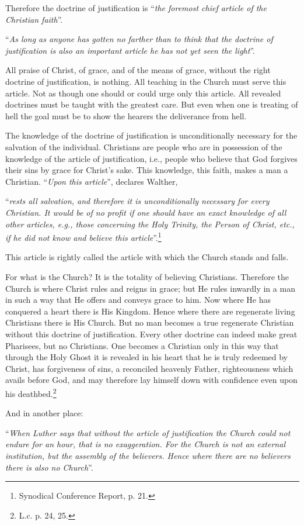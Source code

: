                 Therefore the doctrine of justification is “\textit{the foremost chief article of the Christian faith}”.  \begin{displayquote} “\textit{As long as anyone has gotten no farther than to think that the doctrine of justification is also an important article he has not yet seen the light}”.\end{displayquote} All praise of Christ, of grace, and of the means of grace, without the right doctrine of justification, is nothing.  All teaching in the Church must serve this article.  Not as though one should or could urge only this article.  All revealed doctrines must be taught with the greatest care.  But even when one is treating of hell the goal must be to show the hearers the deliverance from hell.

                The knowledge of the doctrine of justification is unconditionally necessary for the salvation of the individual.  Christians are people who are in possession of the knowledge of the article of justification, i.e., people who believe that God forgives their sins by grace for Christ’s sake.  This knowledge, this faith, makes a man a Christian.  “\textit{Upon this article}”, declares Walther, \begin{displayquote}``\textit{rests all salvation, and therefore it is unconditionally necessary for every Christian.  It would be of no profit if one should have an exact knowledge of all other articles, e.g., those concerning the Holy Trinity, the Person of Christ, etc., if he did not know and believe this article}”.\footnote{Synodical Conference Report, p. 21.}\end{displayquote}

                This article is rightly called the article with which the Church stands and falls.  \begin{fancyquotes}For what is the Church?  \divider It is the totality of believing Christians.  Therefore the Church is where Christ rules and reigns in grace; but He rules inwardly in a man in such a way that He offers and conveys grace to him.  Now where He has conquered a heart there is His Kingdom.  Hence where there are regenerate living Christians there is His Church.  But no man becomes a true regenerate Christian without this doctrine of justification.  Every other doctrine can indeed make great Pharisees, but no Christians.  One becomes a Christian only in this way that through the Holy Ghost it is revealed in his heart that he is truly redeemed by Christ, has forgiveness of sins, a reconciled heavenly Father, righteousness which avails before God, and may therefore lay himself down with confidence even upon his deathbed.\footnote{L.c. p. 24, 25.}\end{fancyquotes}  And in another place: \begin{displayquote}“\textit{When Luther says that without the article of justification the Church could not endure for an hour, that is no exaggeration.  For the Church is not an external institution, but the assembly of the believers.  Hence  where there are no believers there is also no Church}”.\end{displayquote}

